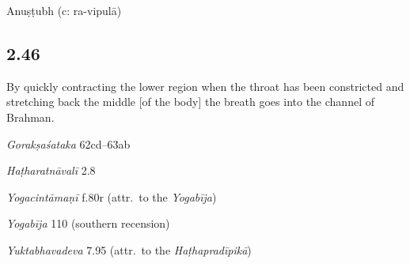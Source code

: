\begin{ekdosis}
\begin{metre}[hp02_045]
Anuṣṭubh (c: ra-vipulā)
\end{metre}

\subsection*{2.46}
\begin{translation}[hp02_046]
By quickly contracting the lower region when the throat has been constricted and stretching back the middle [of the body] the breath goes into the channel of Brahman.
\end{translation}

\begin{sources}[hp02_046]
\emph{Gorakṣaśataka} 62cd–63ab
\begin{versinnote}
\end{versinnote}
\end{sources}

\begin{testimonia}[hp02_046]
\emph{Haṭharatnāvalī} 2.8
\begin{versinnote}
\end{versinnote}

\emph{Yogacintāmaṇī} f.80r (attr.~to the \emph{Yogabīja})

\begin{versinnote}
\end{versinnote}

\emph{Yogabīja} 110 (southern recension)
\begin{versinnote}
\end{versinnote}

\emph{Yuktabhavadeva} 7.95 (attr.~to the \emph{Haṭhapradīpikā})

\begin{versinnote}
\end{versinnote}


\end{testimonia}
\end{ekdosis}
